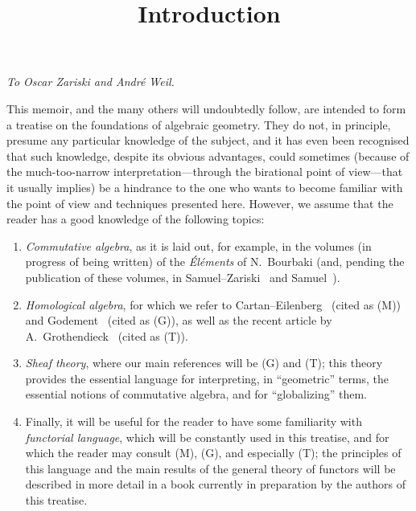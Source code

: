 


\title{Introduction}
\maketitle

\label{section:phantom}

\begin{flushright}
\emph{To Oscar Zariski and Andr\'e Weil.}
\end{flushright}
\medskip

This memoir, and the many others will undoubtedly follow, are intended to form a treatise on the foundations of algebraic geometry.
They do not, in principle, presume any particular knowledge of the subject, and it has even been recognised that such knowledge, despite its obvious advantages, could sometimes (because of the much-too-narrow interpretation---through the birational point of view---that it usually implies) be a hindrance to the one who wants to become familiar with the point of view and techniques presented here.
However, we assume that the reader has a good knowledge of the following topics:
\begin{enumerate}[label=(\alph*)]
    \item \emph{Commutative algebra}, as it is laid out, for example, in the volumes (in progress of being written) of the \emph{\'El\'ements} of N.~Bourbaki (and, pending the publication of these volumes, in Samuel--Zariski~\cite{I-13} and Samuel~\cite{I-11,I-12}).
    \item \emph{Homological algebra}, for which we refer to Cartan--Eilenberg~\cite{I-2} (cited as (M)) and Godement~\cite{I-4} (cited as (G)), as well as the recent article by A.~Grothendieck~\cite{I-6} (cited as (T)).
    \item \emph{Sheaf theory}, where our main references will be (G) and (T);
        this theory provides the essential language for interpreting, in ``geometric'' terms, the essential notions of commutative algebra, and for ``globalizing'' them.
    \item Finally, it will be useful for the reader to have some familiarity with \emph{functorial language}, which will be constantly used in this treatise, and for which the reader may consult (M), (G), and especially (T);
        the principles of this language and the main results of the general theory of functors will be described in more detail in a book currently in preparation by the authors of this treatise.
\end{enumerate}

